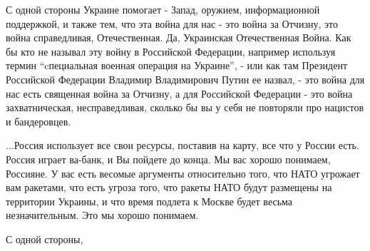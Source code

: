 С одной стороны Украине помогает - Запад, оружием, информационной поддержкой, и
также тем, что эта война для нас - это война за Отчизну, это война
справедливая, Отечественная. Да, Украинская Отечественная Война. Как бы кто не
называл эту войну в Российской Федерации, например используя термин
\enquote{cпециальная военная операция на Украине}, - или как там Президент
Российской Федерации Владимир Владимирович Путин ее назвал, - это война для нас
есть священная война за Отчизну, а для Российской Федерации - это война
захватническая, несправедливая, сколько бы вы у себя не повторяли про нацистов
и бандеровцев. 

...Россия использует все свои ресурсы, поставив на карту, все что у России
есть. Россия играет ва-банк, и Вы пойдете до конца. Мы вас хорошо понимаем,
Россияне. У вас есть весомые аргументы относительно того, что НАТО угрожает вам
ракетами, что есть угроза того, что ракеты НАТО будут размещены на территории
Украины, и что время подлета к Москве будет весьма незначительным. Это мы
хорошо понимаем. 

С одной стороны,
